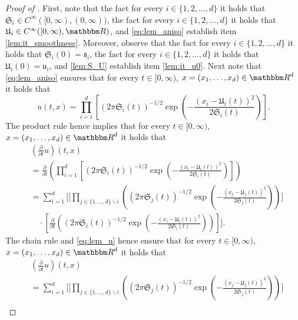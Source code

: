 \begin{proof}[Proof of ]
	First, note that the fact for every
	$i \in \{1,2,\dots,d\}$
	it holds that
	$\mathfrak{S}_i \in C^{\infty}([0,\infty),(0,\infty))$,
	the fact for every
	$i \in \{1,2,\dots,d\}$
	it holds that
	$\mathfrak{U}_i \in C^{\infty}([0,\infty),\R) $,
	and \eqref{eq:lem_aniso}
	establish item \eqref{lem:it_smoothness}.
	Moreover, observe that the fact for every
	$i \in \{1,2,\dots,d\}$
	it holds that
	$\mathfrak{S}_i(0) = \mathfrak{s}_i$,
	the fact for every
	$i \in \{1,2,\dots,d\}$
	it holds that
	$\mathfrak{U}_i(0) = \mathfrak{u}_i$,
	and
	\eqref{lem:S_U}
	establish  item \eqref{lem:it_u0}.
	Next note that \eqref{eq:lem_aniso} ensures that for every
	$t \in [0,\infty)$,
	$x = (x_1,\dots,x_d)\in \R^d$
	it holds that
	\begin{equation}\label{eq:lem_u}
		u(t,x) = \prod_{i=1}^d \left[ (2\pi    \mathfrak{S}_i(t))^{-1/2}    \exp \! \left( - \frac{(x_i -\mathfrak{U}_i(t) )^2}{2\mathfrak{S}_i(t)}\right) \right].
	\end{equation}
	The product rule hence implies that for every
	$t \in [0,\infty)$,
	$x = (x_1,\dots,x_d)\in \R^d$
	it holds that
	\begin{equation}
	\begin{split}
			&(\tfrac{\partial }{\partial t}u) (t,x)  \\
			& = \frac{\partial}{\partial t} \left(\prod_{i=1}^d \left[ (2\pi   \mathfrak{S}_i(t))^{-1/2}  \exp \left( - \frac{(x_i -\mathfrak{U}_i(t) )^2}{2\mathfrak{S}_i(t)}\right) \right] \right)\\
			& = \sum_{i=1}^d \Bigg[  \bigg[ \prod\nolimits_{ j \in \{ 1,\dots,d \} \backslash i} \left( (2\pi \mathfrak{S}_j(t))^{-1/2} \exp \! \left( - \frac{(x_j -\mathfrak{U}_j(t) )^2}{2\mathfrak{S}_j(t)}\right) \right)\bigg]\\
			&\quad \cdot \left[ \frac{\partial}{\partial t} \left( (2\pi   \mathfrak{S}_i(t))^{-1/2}   \exp \! \left(- \frac{(x_i -\mathfrak{U}_i(t) )^2}{2\mathfrak{S}_i(t)}\right) \right)  \right] \Bigg].
	\end{split} 
	\end{equation}
	The chain rule and \eqref{eq:lem_u} hence ensure that for every
	$t \in [0,\infty)$,
	$x = (x_1,\dots,x_d)\in \R^d$
	it holds that
	\begin{equation}\label{lem:derivatives1}
		\begin{split}
				&(\tfrac{\partial }{\partial t}u) (t,x)  \\
				& = \sum_{i=1}^d \Bigg[  \bigg[ \prod\nolimits_{ j \in \{ 1,\dots,d \} \backslash i} \left( (2\pi \mathfrak{S}_j(t))^{-1/2} \exp \! \left( - \frac{(x_j -\mathfrak{U}_j(t) )^2}{2\mathfrak{S}_j(t)}\right) \right)\bigg]\\

\end{split}
\end{equation}
\end{proof}
